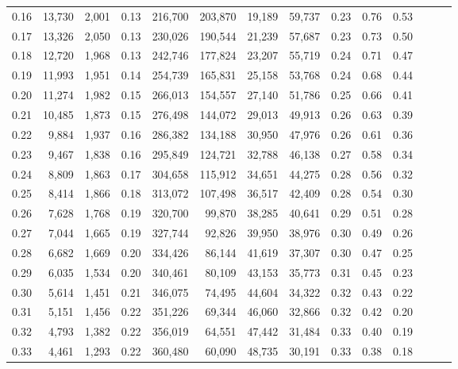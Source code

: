 \begin{tabular}{rrrrrrrrrrrrrr}
0.16 &  13,730 &  2,001 &  0.13 &  216,700 &  203,870 &  19,189 &  59,737 &  0.23 &  0.76 &      0.53 \\
0.17 &  13,326 &  2,050 &  0.13 &  230,026 &  190,544 &  21,239 &  57,687 &  0.23 &  0.73 &      0.50 \\
0.18 &  12,720 &  1,968 &  0.13 &  242,746 &  177,824 &  23,207 &  55,719 &  0.24 &  0.71 &      0.47 \\
0.19 &  11,993 &  1,951 &  0.14 &  254,739 &  165,831 &  25,158 &  53,768 &  0.24 &  0.68 &      0.44 \\
0.20 &  11,274 &  1,982 &  0.15 &  266,013 &  154,557 &  27,140 &  51,786 &  0.25 &  0.66 &      0.41 \\
0.21 &  10,485 &  1,873 &  0.15 &  276,498 &  144,072 &  29,013 &  49,913 &  0.26 &  0.63 &      0.39 \\
0.22 &   9,884 &  1,937 &  0.16 &  286,382 &  134,188 &  30,950 &  47,976 &  0.26 &  0.61 &      0.36 \\
0.23 &   9,467 &  1,838 &  0.16 &  295,849 &  124,721 &  32,788 &  46,138 &  0.27 &  0.58 &      0.34 \\
0.24 &   8,809 &  1,863 &  0.17 &  304,658 &  115,912 &  34,651 &  44,275 &  0.28 &  0.56 &      0.32 \\
0.25 &   8,414 &  1,866 &  0.18 &  313,072 &  107,498 &  36,517 &  42,409 &  0.28 &  0.54 &      0.30 \\
0.26 &   7,628 &  1,768 &  0.19 &  320,700 &   99,870 &  38,285 &  40,641 &  0.29 &  0.51 &      0.28 \\
0.27 &   7,044 &  1,665 &  0.19 &  327,744 &   92,826 &  39,950 &  38,976 &  0.30 &  0.49 &      0.26 \\
0.28 &   6,682 &  1,669 &  0.20 &  334,426 &   86,144 &  41,619 &  37,307 &  0.30 &  0.47 &      0.25 \\
0.29 &   6,035 &  1,534 &  0.20 &  340,461 &   80,109 &  43,153 &  35,773 &  0.31 &  0.45 &      0.23 \\
0.30 &   5,614 &  1,451 &  0.21 &  346,075 &   74,495 &  44,604 &  34,322 &  0.32 &  0.43 &      0.22 \\
0.31 &   5,151 &  1,456 &  0.22 &  351,226 &   69,344 &  46,060 &  32,866 &  0.32 &  0.42 &      0.20 \\
0.32 &   4,793 &  1,382 &  0.22 &  356,019 &   64,551 &  47,442 &  31,484 &  0.33 &  0.40 &      0.19 \\
0.33 &   4,461 &  1,293 &  0.22 &  360,480 &   60,090 &  48,735 &  30,191 &  0.33 &  0.38 &      0.18 \\

\end{tabular}
